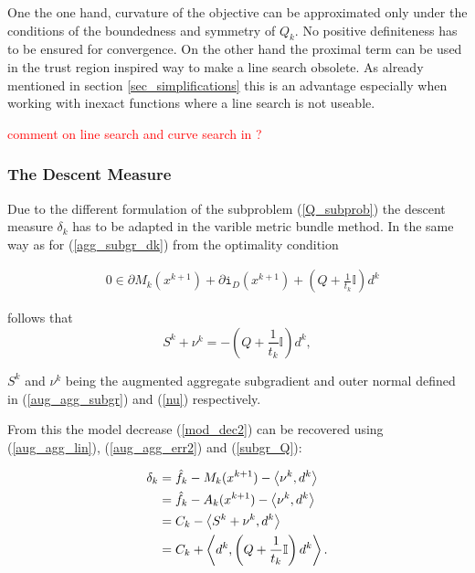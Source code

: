 One the one hand, curvature of the objective can be approximated only under the conditions of the boundedness and symmetry of \(Q_k\). No positive definiteness has to be ensured for convergence.
On the other hand the proximal term can be used in the trust region inspired way to make a line search obsolete. As already mentioned in section \ref{sec_simplifications} this is an advantage especially when working with inexact functions where a line search is not useable.

\textcolor{red}{comment on line search and curve search in \cite{Lemarechal1994,Lemarechal1997,Vlcek2001}?}

\subsubsection{The Descent Measure}

Due to the different formulation of the subproblem (\ref{Q_subprob}) the descent measure \(\delta_k\) has to be adapted in the varible metric bundle method.
In the same way as for (\ref{agg_subgr_dk}) from the optimality condition

\begin{align*}
	& 0 \in \partial M_k(x^{k+1})+\partial\mathtt{i}_{D}(x^{k+1})+\left(Q+\frac{1}{t_k}\mathbb{I}\right)d^k
	\label{Noll_opt_cond}
\end{align*}

follows that 
\begin{equation}
	S^k+\nu^k = -\left(Q+\frac{1}{t_k}\mathbb{I}\right)d^k,
	\label{subgr_Q}
\end{equation}

\(S^k\) and \(\nu^k\) being the augmented aggregate subgradient and outer normal defined in (\ref{aug_agg_subgr}) and (\ref{nu}) respectively.

From this the model decrease (\ref{mod_dec2}) can be recovered using (\ref{aug_agg_lin}), (\ref{aug_agg_err2}) and (\ref{subgr_Q}):

\begin{equation}
\begin{split}
	\delta_k  &= \hat{f}_k - M_k(x^{k+1}) - \left\langle\nu^k,d^k\right\rangle\\
	&= \hat{f}_k - A_k(x^{k+1}) - \left\langle\nu^k,d^k\right\rangle\\
	&= C_k - \left\langle S^k+\nu^k,d^k\right\rangle \\
	&= C_k + \left\langle d^k,\left(Q+\frac{1}{t_k}\mathbb{I}\right)d^k\right\rangle.
	\label{Noll_delta}
\end{split}
\end{equation}

